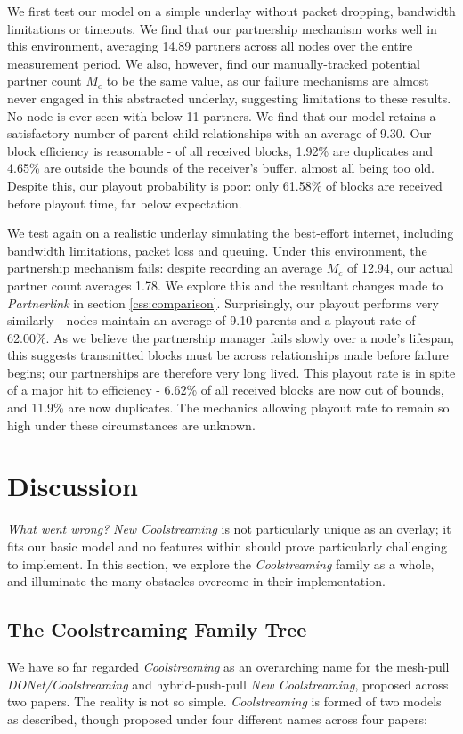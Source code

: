 \documentclass[12pt,a4paper]{article}
\begin{document}
We first test our model on a simple underlay without packet dropping, bandwidth limitations or timeouts. We find that our partnership mechanism works well in this environment, averaging 14.89 partners across all nodes over the entire measurement period. We also, however, find our manually-tracked potential partner count \(M_c\) to be the same value, as our failure mechanisms are almost never engaged in this abstracted underlay, suggesting limitations to these results. No node is ever seen with below 11 partners. We find that our model retains a satisfactory number of parent-child relationships with an average of 9.30. Our block efficiency is reasonable - of all received blocks, 1.92\% are duplicates and 4.65\% are outside the bounds of the receiver's buffer, almost all being too old. Despite this, our playout probability is poor: only 61.58\% of blocks are received before playout time, far below expectation.

We test again on a realistic underlay simulating the best-effort internet, including bandwidth limitations, packet loss and queuing. Under this environment, the partnership mechanism fails: despite recording an average \(M_c\) of 12.94, our actual partner count averages 1.78. We explore this and the resultant changes made to \textit{Partnerlink} in section \ref{css:comparison}. Surprisingly, our playout performs very similarly - nodes maintain an average of 9.10 parents and a playout rate of 62.00\%. As we believe the partnership manager fails slowly over a node's lifespan, this suggests transmitted blocks must be across relationships made before failure begins; our partnerships are therefore very long lived. This playout rate is in spite of a major hit to efficiency - 6.62\% of all received blocks are now out of bounds, and 11.9\% are now duplicates. The mechanics allowing playout rate to remain so high under these circumstances are unknown.

\section{Discussion} \label{problems}
\textit{What went wrong?} \textit{New Coolstreaming} is not particularly unique as an overlay; it fits our basic model and no features within should prove particularly challenging to implement. In this section, we explore the \textit{Coolstreaming} family as a whole, and illuminate the many obstacles overcome in their implementation.

\subsection{The Coolstreaming Family Tree} \label{problems:familytree}
We have so far regarded \textit{Coolstreaming} as an overarching name for the mesh-pull \textit{DONet/Coolstreaming} and hybrid-push-pull \textit{New Coolstreaming}, proposed across two papers. The reality is not so simple. \textit{Coolstreaming} is formed of two models as described, though proposed under four different names across four papers:
\end{document}
